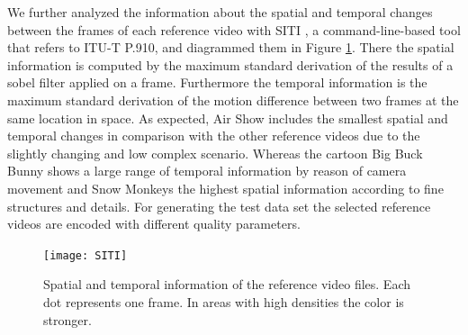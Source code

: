 We further analyzed the information about the spatial and temporal changes between the frames of each reference video with SITI \cite{web:SITI}, a command-line-based tool that refers to ITU-T P.910, and diagrammed them in Figure \ref{fig:SITI}.
There the spatial information is computed by the maximum standard derivation of the results of a sobel filter applied on a frame. Furthermore the temporal information is the maximum standard derivation of the motion difference between two frames at the same location in space.
As expected, Air Show includes the smallest spatial and temporal changes in comparison with the other reference videos due to the slightly changing and low complex scenario. Whereas the cartoon Big Buck Bunny shows a large range of temporal information by reason of camera movement and Snow Monkeys the highest spatial information according to fine structures and details.
For generating the test data set the selected reference videos are encoded with different quality parameters.

\begin{figure}[hbt!]
	\centering
	\texttt{[image: SITI]}
	\caption{Spatial and temporal information of the reference video files. Each dot represents one frame. In areas with high densities the color is stronger.}
	\label{fig:SITI}
\end{figure}
